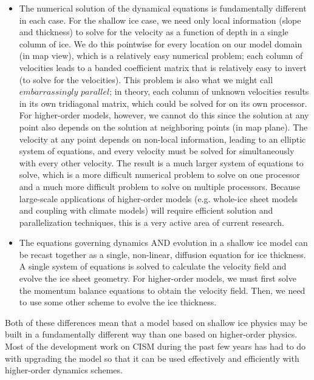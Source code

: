 \begin{itemize}
\item  The numerical solution of the dynamical equations is fundamentally different in each case. For the shallow ice case, we need only local information (slope and thickness) to solve for the velocity as a function of depth in a single column of ice. We do this pointwise for every location on our model domain (in map view), which is a relatively easy numerical problem; each column of velocities leads to a banded coefficient matrix that is relatively easy to invert (to solve for the velocities). This problem is also what we might call $embarrassingly$ $parallel$; in theory, each column of unknown velocities results in its own tridiagonal matrix, which could be solved for on its own processor. For higher-order models, however, we cannot do this since the solution at any point also depends on the solution at neighboring points (in map plane). The velocity at any point depends on non-local information, leading to an elliptic system of equations, and every velocity must be solved for simultaneously with every other velocity. The result is a much larger system of equations to solve, which is a more difficult numerical problem to solve on one processor and a much more difficult problem to solve on multiple processors. Because large-scale applications of higher-order models (e.g. whole-ice sheet models and coupling with climate models) will require efficient solution and parallelization techniques, this is a very active area of current research.  
\end{itemize}

\begin{itemize}
\item  The equations governing dynamics AND evolution in a shallow ice model can be recast together as a single, non-linear, diffusion equation for ice thickness. A single system of equations is solved to calculate the velocity field and evolve the ice sheet geometry. For higher-order models, we must first solve the momentum balance equations to obtain the velocity field. Then, we need to use some other scheme to evolve the ice thickness. 
\end{itemize}

Both of these differences mean that a model based on shallow ice physics may be built in a fundamentally different way than one based on higher-order physics. Most of the development work on CISM during the past few years has had to do with upgrading the model so that it can be used effectively and efficiently with higher-order dynamics schemes.  

